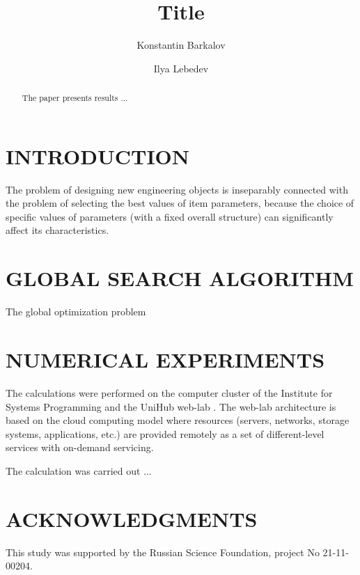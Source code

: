 \documentclass{aip-cp}
\begin{document}
\title{Title}

\author[aff1]{Konstantin Barkalov}
\author[aff1]{Ilya Lebedev}


\maketitle

\begin{abstract}
The paper presents results ...
\end{abstract}

\section{INTRODUCTION}

The problem of designing new engineering objects is inseparably connected with the problem of selecting the best values of item parameters, because the choice of specific values of parameters (with a fixed overall structure) can significantly affect its characteristics.


\section{GLOBAL SEARCH ALGORITHM}


The global optimization problem \cite{Strongin2000}


\section{NUMERICAL EXPERIMENTS}

The calculations were performed on the computer cluster of the Institute for Systems Programming and the UniHub web-lab \cite{UniHub}. The web-lab architecture is based on the cloud computing model where resources (servers, networks, storage systems, applications, etc.) are provided remotely as a set of different-level services with on-demand servicing.


The calculation was carried out ...

\section{ACKNOWLEDGMENTS}
This study was supported by the Russian Science Foundation, project No 21-11-00204.




%
%
\end{document}
